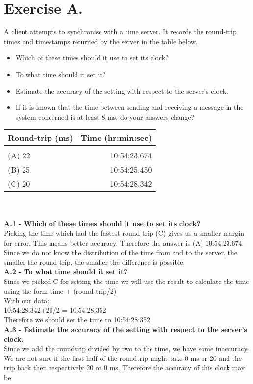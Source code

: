\section{Exercise A.}
A client attempts to synchronise with a time server. It records the round-trip times and timestamps returned by the server in the table below.\\
\begin{itemize}
\item Which of these times should it use to set its clock? 
\item To what time should it set it? 
\item Estimate the accuracy of the setting with respect to the server’s clock. 
\item If it is known that the time between sending and receiving a message in the system concerned is at least 8 ms, do your answers change?
\end{itemize}
\begin{tabular}{ l | r }
Round-trip (ms) & Time (hr:min:sec) \\[0.1cm]
\hline \\
(A) 22 & 10:54:23.674 \\[0.1cm]
(B) 25 & 10:54:25.450 \\[0.1cm]
(C) 20 & 10:54:28.342 \\[0.1cm]
\hline 
\end{tabular}\\\\

\textbf{A.1 - Which of these times should it use to set its clock?}\\
Picking the time which had the fastest round trip (C) gives us a smaller margin for error. This means better accuracy. Therefore the answer is (A) 10:54:23.674. Since we do not know the distribution of the time from and to the server, the smaller the round trip, the smaller the difference is possible.\\

\textbf{A.2 - To what time should it set it?}\\
Since we picked C for setting the time we will use the result to calculate the time using the form
time + (round trip/2)\\
With our data:\\
10:54:28:342+20/2 = 10:54:28:352\\
Therefore we should set the time to 10:54:28:352\\

\textbf{A.3 - Estimate the accuracy of the setting with respect to the server’s clock.}\\
Since we add the roundtrip divided by two to the time, we have some inaccuracy. We are not sure if the first half of the roundtrip might take 0 ms or 20 and the trip back then respectively 20 or 0 ms. Therefore the accuracy of this clock may be \\


